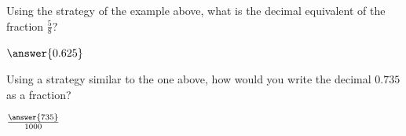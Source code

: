 \documentclass{ximera}
\begin{document}
\begin{question}
Using the strategy of the example above, what is the decimal equivalent of the fraction $\frac{5}{8}$?

\begin{prompt}
$\answer{0.625}$
\end{prompt}
\end{question}


\begin{question}
Using a strategy similar to the one above, how would you write the decimal $0.735$ as a fraction?

\begin{prompt}
$\frac{\answer{735}}{1000}$
\end{prompt}
\end{question}
\end{document}
